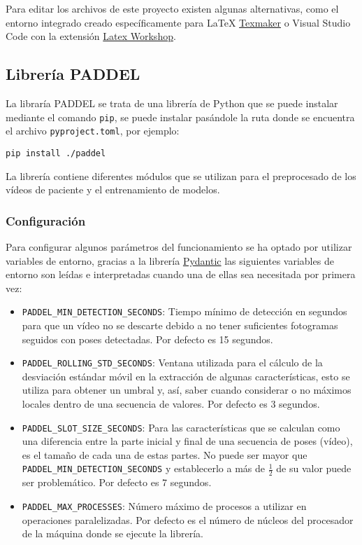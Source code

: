 Para editar los archivos de este proyecto existen algunas alternativas, como el
entorno integrado creado específicamente para \LaTeX{}
\href{https://www.xm1math.net/texmaker/}{Texmaker} o Visual Studio Code con la
extensión
\href{https://marketplace.visualstudio.com/items?itemName=James-Yu.latex-workshop}{Latex
    Workshop}.

\subsection{Librería PADDEL}

La libraría PADDEL se trata de una librería de Python que se puede instalar
mediante el comando \texttt{pip}, se puede instalar pasándole la ruta donde se
encuentra el archivo \texttt{pyproject.toml}, por ejemplo:

\texttt{pip install ./paddel}

La librería contiene diferentes módulos que se utilizan para el preprocesado de
los vídeos de paciente y el entrenamiento de modelos.

\subsubsection{Configuración}

Para configurar algunos parámetros del funcionamiento se ha optado por utilizar
variables de entorno, gracias a la librería
\href{https://docs.pydantic.dev/latest/}{Pydantic} las siguientes variables de
entorno son leídas e interpretadas cuando una de ellas sea necesitada por
primera vez:

\begin{itemize}
    \item \texttt{PADDEL\_MIN\_DETECTION\_SECONDS}: Tiempo mínimo de detección en
    segundos para que un vídeo no se descarte debido a no tener suficientes
    fotogramas seguidos con poses detectadas. Por defecto es 15 segundos.
    \item \texttt{PADDEL\_ROLLING\_STD\_SECONDS}: Ventana utilizada para el cálculo
    de la desviación estándar móvil en la extracción de algunas características,
    esto se utiliza para obtener un umbral y, así, saber cuando considerar o no
    máximos locales dentro de una secuencia de valores. Por defecto es 3
    segundos.
    \item \texttt{PADDEL\_SLOT\_SIZE\_SECONDS}: Para las características que se
    calculan como una diferencia entre la parte inicial y final de una secuencia
    de poses (vídeo), es el tamaño de cada una de estas partes. No puede ser
    mayor que \texttt{PADDEL\_MIN\_DETECTION\_SECONDS} y establecerlo a más de
    $\frac{1}{2}$ de su valor puede ser problemático. Por defecto es 7 segundos.
    \item \texttt{PADDEL\_MAX\_PROCESSES}: Número máximo de procesos a utilizar en
    operaciones paralelizadas. Por defecto es el número de núcleos del
    procesador de la máquina donde se ejecute la librería.
\end{itemize}


